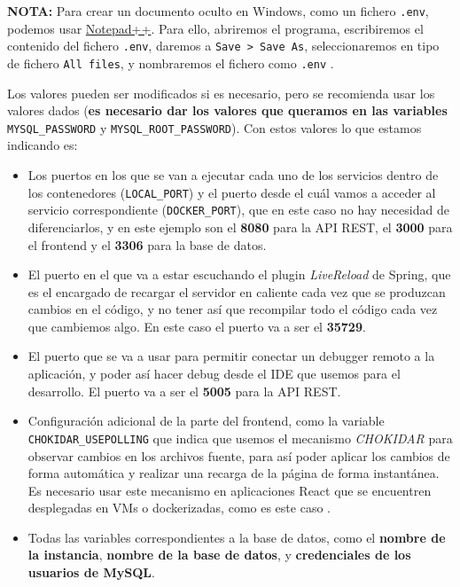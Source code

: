 \textbf{NOTA:} Para crear un documento oculto en Windows, como un fichero \verb,.env,, podemos usar \href{https://notepad-plus-plus.org/}{Notepad++}. Para ello, abriremos el programa, escribiremos el contenido del fichero \verb,.env,, daremos a \verb,Save > Save As,, seleccionaremos en tipo de fichero \verb,All files,, y nombraremos el fichero como \verb,.env, \cite{stack-overflow:env-file-windows}.

Los valores pueden ser modificados si es necesario, pero se recomienda usar los valores dados (\textbf{es necesario dar los valores que queramos en las variables} \verb,MYSQL_PASSWORD, y \verb,MYSQL_ROOT_PASSWORD,). Con estos valores lo que estamos indicando es:

\begin{itemize}
	\item Los puertos en los que se van a ejecutar cada uno de los servicios dentro de los contenedores (\verb,LOCAL_PORT,) y el puerto desde el cuál vamos a acceder al servicio correspondiente (\verb,DOCKER_PORT,), que en este caso no hay necesidad de diferenciarlos, y en este ejemplo son el \textbf{8080} para la API REST, el \textbf{3000} para el frontend y el \textbf{3306} para la base de datos.
	\item El puerto en el que va a estar escuchando el plugin \textit{LiveReload} de Spring, que es el encargado de recargar el servidor en caliente cada vez que se produzcan cambios en el código, y no tener así que recompilar todo el código cada vez que cambiemos algo. En este caso el puerto va a ser el \textbf{35729}.
	\item El puerto que se va a usar para permitir conectar un debugger remoto a la aplicación, y poder así hacer debug desde el IDE que usemos para el desarrollo. El puerto va a ser el \textbf{5005} para la API REST.
	\item Configuración adicional de la parte del frontend, como la variable \verb,CHOKIDAR_USEPOLLING, que indica que usemos el mecanismo \textit{CHOKIDAR} para observar cambios en los archivos fuente, para así poder aplicar los cambios de forma automática y realizar una recarga de la página de forma instantánea. Es necesario usar este mecanismo en aplicaciones React que se encuentren desplegadas en VMs o dockerizadas, como es este caso \cite{create-react-app:advanced-conf}.
	\item Todas las variables correspondientes a la base de datos, como el \textbf{nombre de la instancia}, \textbf{nombre de la base de datos}, y \textbf{credenciales de los usuarios de MySQL}.
\end{itemize}

